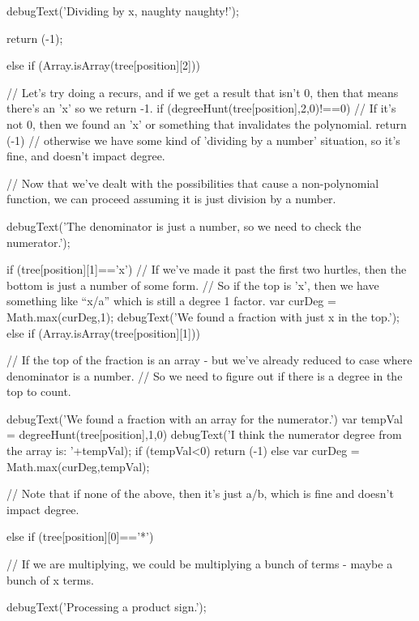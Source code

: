 \documentclass{ximera}
\begin{document}
\begin{javascript}
{{{            debugText('Dividing by x, naughty naughty!');
            
            return (-1);
        } else if (Array.isArray(tree[position][2])) {
            //  Let's try doing a recurs, and if we get a result that isn't 0, then that means there's an 'x' so we return -1.
            if (degreeHunt(tree[position],2,0)!==0) {
                // If it's not 0, then we found an 'x' or something that invalidates the polynomial.
                return (-1)
            } // otherwise we have some kind of 'dividing by a number' situation, so it's fine, and doesn't impact degree.
            
        }
        
        // Now that we've dealt with the possibilities that cause a non-polynomial function, we can proceed assuming it is just division by a number.
        
        debugText('The denominator is just a number, so we need to check the numerator.');
        
        if (tree[position][1]=='x') {
            // If we've made it past the first two hurtles, then the bottom is just a number of some form.
            //  So if the top is 'x', then we have something like ``x/a'' which is still a degree 1 factor.
            var curDeg = Math.max(curDeg,1);
            debugText('We found a fraction with just x in the top.');
        } else if (Array.isArray(tree[position][1])) {
            // If the top of the fraction is an array - but we've already reduced to case where denominator is a number.
            //  So we need to figure out if there is a degree in the top to count.
            
            debugText('We found a fraction with an array for the numerator.')
            var tempVal = degreeHunt(tree[position],1,0)
            debugText('I think the numerator degree from the array is: '+tempVal);
            if (tempVal<0) { return (-1)} else {
                 var curDeg = Math.max(curDeg,tempVal);
            }
            
        }// Note that if none of the above, then it's just a/b, which is fine and doesn't impact degree.

    } else if (tree[position][0]=='*') {
        // If we are multiplying, we could be multiplying a bunch of terms - maybe a bunch of x terms.
        
        debugText('Processing a product sign.');
        
}}
\end{javascript}
\end{document}
